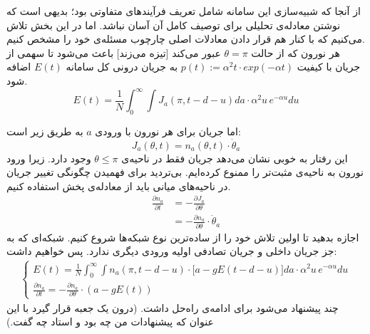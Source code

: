 
\label{chap:analytics}

از آنجا که شبیه‌سازی این سامانه شامل تعریف فرآیندهای متفاوتی بود؛ بدیهی است که نوشتن معادله‌ی تحلیلی برای توصیف کامل آن آسان نباشد. اما در این بخش تلاش می‌کنیم که با کنار هم قرار دادن معادلات اصلی چارچوب مسئله‌ی خود را مشخص کنیم.\\
هر نورون که از حالت $\theta = \pi$ عبور می‌کند [تیزه می‌زند] باعث می‌شود تا سهمی از جریان با کیفیت $p(t):= \alpha^2 t \cdot exp(-\alpha t)$ به جریان درونی کل سامانه $E(t)$ اضافه شود.
\begin{equation}
	E(t) = \frac{1}{N}\int_{0}^{\infty} \int J_a (\pi,t-d-u) da \cdot \alpha^2 u\, e^{-\alpha u} du 
	\label{eq:general_field}
\end{equation}

اما جریان برای هر نورون با ورودی $a$ به طریق زیر است:
\begin{equation}
	J_a (\theta, t) = n_a(\theta,t) \cdot \dot \theta_a
\end{equation}
این رفتار به خوبی نشان می‌دهد جریان فقط در ناحیه‌ی $\theta \leq \pi$ وجود دارد. زیرا ورود نورون به ناحیه‌ی مثبت‌تر را ممنوع کرده‌ایم.  بی‌تردید برای فهمیدن چگونگی تغییر جریان در ناحیه‌های میانی باید از معادله‌ی پخش استفاده کنیم.
\begin{align}
	\frac{\partial n_a}{\partial t} &= - \frac{\partial J_a}{\partial \theta} \label{eq:continuity_relation}\\
	&= - \frac{\partial n_a}{\partial \theta} \cdot \dot \theta_a
\end{align}
اجازه بدهید تا اولین تلاش خود را از ساده‌ترین نوع شبکه‌ها شروع کنیم. شبکه‌ای که به جز جریان داخلی و جریان تصادفی اولیه ورودی دیگری ندارد. پس خواهیم داشت:
\begin{align}
	\begin{cases}
		E(t) = \frac{1}{N} \int_{0}^{\infty} \int n_a(\pi,t-d-u) \cdot \big[ a - g E(t-d-u) \big] da \cdot \alpha^2 u\, e^{-\alpha u} du \\
		\frac{\partial n_a}{\partial t} = - \frac{\partial n_a}{\partial \theta} \cdot (a - g E(t) )
	\end{cases}
	\label{eq:simple_network}
\end{align}
چند پیشنهاد می‌شود برای ادامه‌ی راه‌حل داشت. (درون یک جعبه قرار گیرد با این عنوان که پیشنهادات من چه بود و استاد چه گفت.)
